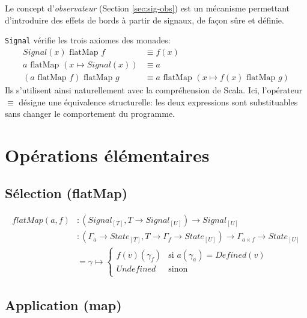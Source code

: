 	Le concept d'\emph{observateur} (Section \ref{sec:sig-obs}) est un mécanisme permettant d'introduire des effets de bords à partir de signaux, de façon sûre et définie.
	
	\texttt{Signal} vérifie les trois axiomes des monades\cite{haskell-monad-laws}:
	\begin{align*}
		Signal(x) \text{ flatMap } f &\equiv f(x) \\
		a \text{ flatMap } (x \mapsto Signal(x)) &\equiv a \\
		(a \text{ flatMap } f)  \text{ flatMap } g &\equiv
			a \text{ flatMap } (x \mapsto f(x)  \text{ flatMap } g) 
	\end{align*}
	Ils s'utilisent ainsi naturellement avec la compréhension  de Scala. Ici, l'opérateur $\equiv$ désigne une équivalence structurelle: les deux expressions sont substituables sans changer le comportement du programme.

\section{Opérations élémentaires}

	\subsection{Sélection (flatMap)}
	
		\begin{center}
		\end{center}
		
		\begin{align*}
			flatMap(a, f)
				&\colon (Signal_{[T]}, T \to Signal_{[U]}) \to Signal_{[U]} \\
				&\colon (\Gamma_a \to State_{[T]}, T \to \Gamma_f \to State_{[U]}) \to \Gamma_{a \times f} \to State_{[U]} \\
				&= \gamma \mapsto \begin{cases}
					f(v)(\gamma_f) & \text{si } a(\gamma_a) = Defined(v)\\
					Undefined & \text{sinon}\\
				\end{cases}
		\end{align*}
	
	\subsection{Application (map)}
		
